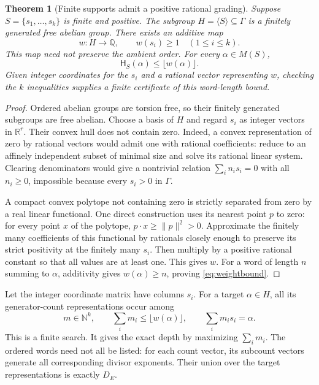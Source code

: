\documentclass[11pt,a4paper]{article}
\newtheorem{theorem}{Theorem}[section]
\theoremstyle{definition}
\theoremstyle{remark}
\newcommand{\N}{\mathbb N}
\newcommand{\Q}{\mathbb Q}
\newcommand{\R}{\mathbb R}
\newcommand{\depth}{\mathsf H}
\begin{document}
\begin{theorem}[Finite supports admit a positive rational grading]
\label{thm:separator}
Suppose $S=\{s_1,\ldots,s_k\}$ is finite and positive. The subgroup
$H=\langle S\rangle\subseteq\Gamma$ is a finitely generated free abelian
group. There exists an additive map
\[
 w:H\longrightarrow\Q,\qquad w(s_i)\ge1\quad(1\le i\le k).
\]
This map need not preserve the ambient order. For every $\alpha\in M(S)$,
\begin{equation}\label{eq:weightbound}
 \depth_S(\alpha)\le\lfloor w(\alpha)\rfloor.
\end{equation}
Given integer coordinates for the $s_i$ and a rational vector representing
$w$, checking the $k$ inequalities supplies a finite certificate of this
word-length bound.
\end{theorem}
\begin{proof}
Ordered abelian groups are torsion free, so their finitely generated
subgroups are free abelian. Choose a basis of $H$ and regard $s_i$ as
integer vectors in $\R^r$. Their convex hull does not contain zero.
Indeed, a convex representation of zero by rational vectors would admit
one with rational coefficients: reduce to an affinely independent subset
of minimal size and solve its rational linear system. Clearing denominators
would give a nontrivial relation
$\sum_i n_is_i=0$ with all $n_i\ge0$, impossible because every $s_i>0$ in
$\Gamma$.

A compact convex polytope not containing zero is strictly separated from
zero by a real linear functional. One direct construction uses its
nearest point $p$ to zero: for every point $x$ of the polytope,
$p\cdot x\ge\|p\|^2>0$. Approximate the finitely many coefficients of
this functional by rationals closely enough to preserve its strict
positivity at the finitely many $s_i$. Then multiply by a positive rational
constant so that all values are at least one. This gives $w$.
For a word of length $n$ summing to $\alpha$, additivity gives
$w(\alpha)\ge n$, proving \eqref{eq:weightbound}.
\end{proof}

Let the integer coordinate matrix have columns $s_i$. For a target
$\alpha\in H$, all its generator-count representations occur among
\begin{equation}\label{eq:enumeration}
 m\in\N^k,\qquad \sum_i m_i\le\lfloor w(\alpha)\rfloor,
 \qquad \sum_i m_is_i=\alpha.
\end{equation}
This is a finite search. It gives the exact depth by maximizing $\sum_i m_i$.
The ordered words need not all be listed: for each count vector, its
subcount vectors generate all corresponding divisor exponents. Their union
over the target representations is exactly $D_E$.
\end{document}
